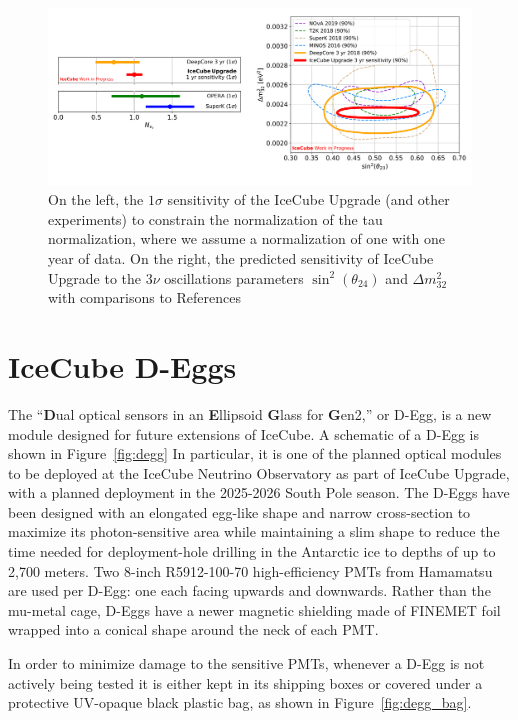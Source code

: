 \documentclass[main.tex]{subfiles}
\begin{document}
\begin{figure}
    \centering
    \includegraphics[width=0.85\linewidth]{figures/upgrade_physics.png}
    \caption{On the left, the $1\sigma$ sensitivity of the IceCube Upgrade (and other experiments) to constrain the normalization of the tau normalization, where we assume a normalization of one with one year of data. On the right, the predicted sensitivity of IceCube Upgrade to the 3$\nu$ oscillations parameters $\sin^{2}(\theta_{24})$ and $\Delta m_{32}^{2}$ with comparisons to References~\cite{PhysRevLett.120.071801, PhysRevD.98.052006, PhysRevLett.120.211801, WHITEHEAD2016130,Haegel_2017}}\label{fig:tau_constrain_upgrade}
\end{figure}


\section{IceCube D-Eggs}

The ``\textbf{D}ual optical sensors in an \textbf{E}llipsoid \textbf{G}lass for \textbf{G}en2,'' or D-Egg, is a new module designed for future extensions of IceCube. 
A schematic of a D-Egg is shown in Figure~\ref{fig:degg}
In particular, it is one of the planned optical modules to be deployed at the IceCube Neutrino Observatory as part of IceCube Upgrade, with a planned deployment in the 2025-2026 South Pole season.
The D-Eggs have been designed with an elongated egg-like shape and narrow cross-section to maximize its photon-sensitive area while maintaining a slim shape to reduce the time needed for deployment-hole drilling in the Antarctic ice to depths of up to 2,700 meters. 
Two 8-inch R5912-100-70 high-efficiency PMTs from Hamamatsu are used per D-Egg: one each facing upwards and downwards. 
Rather than the mu-metal cage, D-Eggs have a newer magnetic shielding made of FINEMET foil wrapped into a conical shape around the neck of each PMT.

In order to minimize damage to the sensitive PMTs, whenever a D-Egg is not actively being tested it is either kept in its shipping boxes or covered under a protective UV-opaque black plastic bag, as shown in Figure~\ref{fig:degg_bag}.
\end{document}
